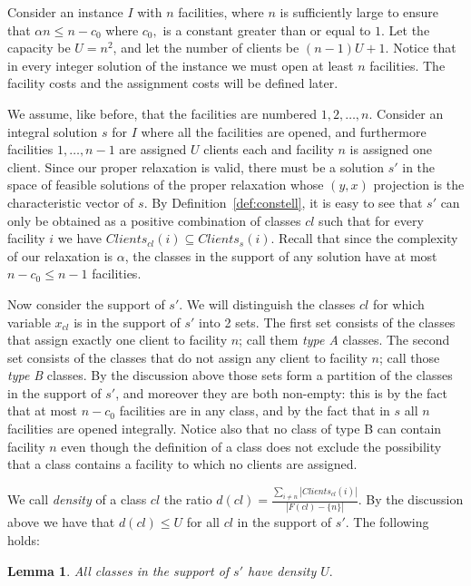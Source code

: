 \documentclass[11pt]{article}
\newtheorem{lemma}{Lemma}[section]
\begin{document}
Consider
an instance $I$ with $n$ facilities, where $n$ is
sufficiently large to ensure  that $\alpha n \leq n - c_0$  where
$c_0,$  is a
constant greater than or equal to  $1$. Let the capacity be $U=n^2$, and let
the number of  clients be $(n-1)U+1$. Notice that in every integer solution of the instance
 we must open  at least $n$ facilities. The  facility costs  and the assignment  costs will  be defined
later.  

 We  assume, like before, that  the  facilities are  numbered
$1,2,\ldots ,n$. 
Consider  an  integral  solution  $s$  for $I$   where  all the
facilities  are opened, and furthermore 
facilities $1,\ldots , n-1$  are assigned $U$ clients each 
and facility $n$ is assigned one client. 
Since our proper  relaxation is valid, there must be a solution $s'$ in the  space of
feasible solutions of the proper relaxation whose $(y,x)$ projection is the characteristic 
vector of $s$.  
By Definition~\ref{def:constell},
it is easy to see that $s'$ can only be obtained as a 
positive combination of classes $cl$ such that for
every    facility   $i$    we   have    $Clients_{cl}(i)   \subseteq
Clients_s(i)$.  Recall  that  since  the  complexity  of  our
relaxation is $\alpha$, the classes in the support of any solution 
have at most $n-c_0 \leq n-1$
facilities. 

Now consider the support  of $s'$. We will distinguish the classes $cl$ for
which variable $x_{cl}$ is in the support of $s'$ into 2 sets. The first set consists 
of the classes that assign exactly one client to facility $n$; call them \emph{type A} classes.
The second set  consists  of the classes that do not assign any client to facility 
$n$; call those \emph{type B} classes. By the discussion above those sets form a
partition of the classes in the support of $s'$, and moreover they are both non-empty: this is
 by the fact that at most  $n-c_0$ facilities are in any class, and by the fact
 that in $s$ all $n$ 
facilities are opened integrally. Notice also that no  class
of type B can contain facility $n$ even though the definition of a class does not
exclude the possibility that a class contains a facility to which no clients are
assigned. 

We call \emph{density} of  a class $cl$ the ratio 
$d(cl)=\frac{\sum_{i\neq n}|Clients_{cl}(i)|}{|F(cl)-\{n\}|}$. By the discussion 
above we have that $d(cl)\leq U$ for all $cl$ in the support of $s'$. The following holds:

\begin{lemma}
All classes in the support of $s'$ have density $U.$
\end{lemma}
\end{document}
